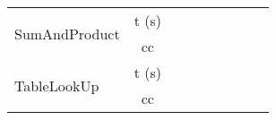 \begin{center}
\begin{table}[]
\begin{tabular}{|l|c|c|c|c|c|c|c|c|}
        \multirow{2}{*}{SumAndProduct}   & \multicolumn{1}{l|}{t (s)} &       &    &    &    &    &      &    \\ \cline{2-9} 
                                         & cc                         &       &    &    &    &    &      &    \\ \hline
        \multirow{2}{*}{TableLookUp}     & \multicolumn{1}{l|}{t (s)} &       &    &    &    &    &      &    \\ \cline{2-9} 
                                         & cc                         &       &    &    &    &    &      &    \\ \hline
        \end{tabular}
        \end{table}
    \end{center}


